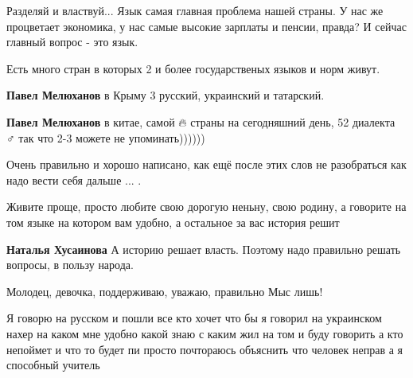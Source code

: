 
Разделяй и властвуй... Язык самая главная проблема нашей страны. У нас же
процветает экономика, у нас самые высокие зарплаты и пенсии, правда? И сейчас
главный вопрос - это язык.

Есть много стран в которых 2 и более государственых языков и норм живут.

\textbf{Павел Мелюханов} в Крыму 3 русский, украинский и татарский.

\textbf{Павел Мелюханов} в китае, самой 🔥 страны на сегодняшний день, 52
диалекта 🤷♂️ так что 2-3 можете не упоминать))))))

Очень правильно и хорошо написано, как ещё после этих слов не разобраться как
надо вести себя дальше ... .


Живите проще, просто любите свою дорогую неньну, свою родину, а говорите на том
языке на котором вам удобно, а остальное за вас история решит

\textbf{Наталья Хусаинова} А историю решает власть. Поэтому надо правильно
решать вопросы, в пользу народа.


Молодец, девочка, поддерживаю, уважаю, правильно Мыс лишь!


Я говорю на русском и пошли все кто хочет что бы я говорил на украинском нахер
на каком мне удобно какой знаю с каким жил на том и буду говорить а кто
непоймет и что то будет пи просто почтораюсь объяснить что человек неправ а я
способный учитель

